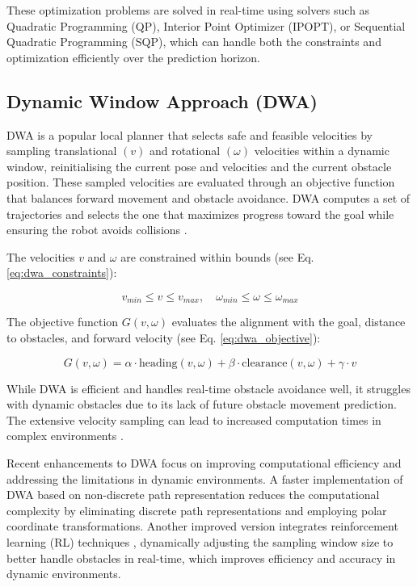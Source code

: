 \documentclass[conference]{IEEEtran}
\begin{document}
These optimization problems are solved in real-time using solvers such as Quadratic Programming (QP), Interior Point Optimizer (IPOPT), or Sequential Quadratic Programming (SQP), which can handle both the constraints and optimization efficiently over the prediction horizon.

\subsection{Dynamic Window Approach (DWA)}
DWA is a popular local planner that selects safe and feasible velocities by sampling translational \((v)\) and rotational \((\omega)\) velocities within a dynamic window, reinitialising the current pose and velocities and the current obstacle position. These sampled velocities are evaluated through an objective function that balances forward movement and obstacle avoidance. DWA computes a set of trajectories and selects the one that maximizes progress toward the goal while ensuring the robot avoids collisions \cite{DWA, fox1997dynamic}.

The velocities \(v\) and \(\omega\) are constrained within bounds (see Eq. \ref{eq:dwa_constraints}):

\begin{equation}
\label{eq:dwa_constraints}
v_{min} \leq v \leq v_{max}, \quad \omega_{min} \leq \omega \leq \omega_{max}
\end{equation}

The objective function \(G(v, \omega)\) evaluates the alignment with the goal, distance to obstacles, and forward velocity (see Eq. \ref{eq:dwa_objective}):

\begin{equation}
\label{eq:dwa_objective}
G(v, \omega) = \alpha \cdot \text{heading}(v, \omega) + \beta \cdot \text{clearance}(v, \omega) + \gamma \cdot v
\end{equation}

While DWA is efficient and handles real-time obstacle avoidance well, it struggles with dynamic obstacles due to its lack of future obstacle movement prediction. The extensive velocity sampling can lead to increased computation times in complex environments \cite{DWA}.

Recent enhancements to DWA focus on improving computational efficiency and addressing the limitations in dynamic environments. A faster implementation of DWA based on non-discrete path representation \cite{lin2023faster} reduces the computational complexity by eliminating discrete path representations and employing polar coordinate transformations. Another improved version integrates reinforcement learning (RL) techniques \cite{zhou2022improved}, dynamically adjusting the sampling window size to better handle obstacles in real-time, which improves efficiency and accuracy in dynamic environments.
\end{document}
